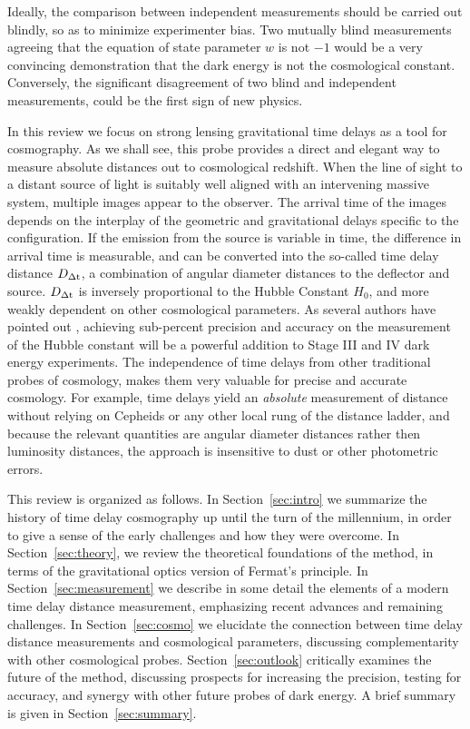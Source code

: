 Ideally, the comparison between independent measurements should be
carried out blindly, so as to minimize experimenter bias. Two mutually
blind measurements agreeing that the equation of state parameter $w$
is not $-1$ would be a very convincing demonstration that the dark
energy is not the cosmological constant. Conversely, the significant
disagreement of two blind and independent measurements, could be the
first sign of new physics.

In this review we focus on strong lensing gravitational time delays as
a tool for cosmography. As we shall see, this probe provides a direct
and elegant way to measure absolute distances out to cosmological
redshift. When the line of sight to a distant source of light is
suitably well aligned with an intervening massive system, multiple
images appear to the observer. The arrival time of the images depends
on the interplay of the geometric and gravitational delays specific to
the configuration. If the emission from the source is variable in
time, the difference in arrival time is measurable, and can be
converted into the so-called time delay distance $D_{\Delta{\rm t}}$, a combination
of angular diameter distances to the deflector and source. $D_{\Delta{\rm t}}$ is
inversely proportional to the Hubble Constant $H_0$, and more
weakly dependent on other cosmological parameters. As several authors
have pointed out \citep{Hu05,Lin11,Suy++12,Wei++13}, achieving
sub-percent precision and accuracy on the measurement of the Hubble
constant will be a powerful addition to Stage III and IV dark energy
experiments. The independence of time delays from other traditional
probes of cosmology, makes them very valuable for precise and accurate
cosmology. For example, time delays yield an {\it absolute}
measurement of distance without relying on Cepheids or any other local
rung of the distance ladder, and because the relevant quantities are
angular diameter distances rather then luminosity distances, the
approach is insensitive to dust or
other photometric errors.

This review is organized as follows. In Section~\ref{sec:intro} we
summarize the history of time delay cosmography up until the turn of
the millennium, in order to give a sense of the early challenges and
how they were overcome. In Section~\ref{sec:theory}, we review the
theoretical foundations of the method, in terms of the gravitational
optics version of Fermat's principle. In Section~\ref{sec:measurement}
we describe in some detail the elements of a modern time delay
distance measurement, emphasizing recent advances and remaining
challenges. In Section~\ref{sec:cosmo} we elucidate the connection
between time delay distance measurements and cosmological parameters,
discussing complementarity with other cosmological
probes. Section~\ref{sec:outlook} critically examines the future of
the method, discussing prospects for increasing the precision, testing
for accuracy, and synergy with other future probes of dark energy. A
brief summary is given in Section~\ref{sec:summary}.


